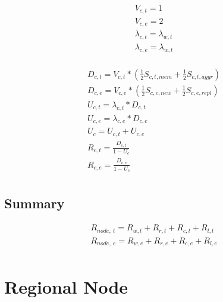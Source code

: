\documentclass[11pt]{article}
\begin{document}
\begin{equation}
    \begin{array}{l}
        V_{c, t} = 1 \\
        V_{c, e} = 2 \\ %
        \lambda_{c, t} = \lambda_{w, t} \\
        \lambda_{c, e} = \lambda_{w, t} \\
    \end{array}
\end{equation}

\begin{equation}
    \begin{array}{l}
        D_{c, t} = V_{c, t} * (\frac{1}{2}S_{c, t, mem} + \frac{1}{2}S_{c, t, aggr}) \\ %
        D_{c, e} = V_{c, e} * (\frac{1}{2}S_{c, e, new} + \frac{1}{2}S_{c, e, repl}) \\
        U_{c, t} = \lambda_{c, t} * D_{c, t} \\
        U_{c, e} = \lambda_{c, e} * D_{c, e} \\
        U_{c} = U_{c, t} + U_{c, e} \\
        R_{c, t} = \frac{D_{c, t}}{1 - U_{c}} \\
        R_{c, e} = \frac{D_{c, e}}{1 - U_{c}} \\
    \end{array}
\end{equation}

\subsection{Summary}
\begin{equation}
    \begin{array}{l}
        R_{node, \ t} = R_{w, t} + R_{r, t} + R_{c, t} + R_{l, t} \\
        R_{node, \ e} = R_{w, e} + R_{r, e} + R_{c, e} + R_{l, e} \\
    \end{array}
\end{equation}


\section{Regional Node}
\end{document}

